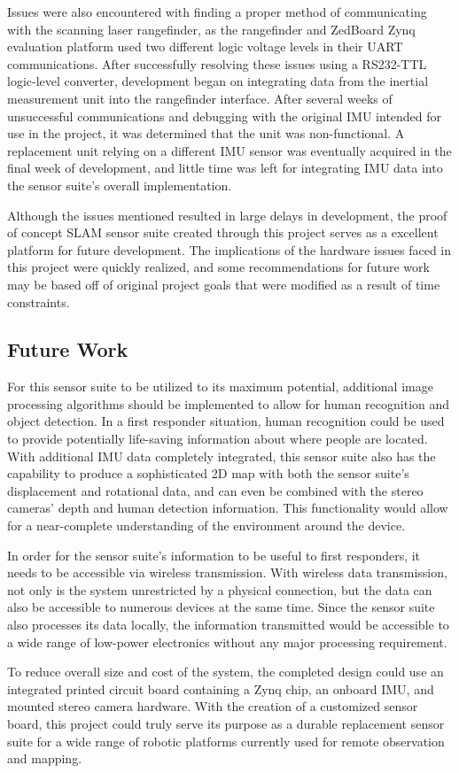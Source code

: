 \par
Issues were also encountered with finding a proper method of communicating with the scanning laser rangefinder, as the rangefinder and ZedBoard Zynq evaluation platform used two different logic voltage levels in their UART communications.  After successfully resolving these issues using a RS232-TTL logic-level converter, development began on integrating data from the inertial measurement unit into the rangefinder interface. After several weeks of unsuccessful communications and debugging with the original IMU intended for use in the project, it was determined that the unit was non-functional. A replacement unit relying on a different IMU sensor was eventually acquired in the final week of development, and little time was left for integrating IMU data into the sensor suite's overall implementation.
\par
Although the issues mentioned resulted in large delays in development, the proof of concept SLAM sensor suite created through this project serves as a excellent platform for future development. The implications of the hardware issues faced in this project were quickly realized, and some recommendations for future work may be based off of original project goals that were modified as a result of time constraints.

\subsection{Future Work}
For this sensor suite to be utilized to its maximum potential, additional image processing algorithms should be implemented to allow for human recognition and object detection. In a first responder situation, human recognition could be used to provide potentially life-saving information about where people are located. With additional IMU data completely integrated, this sensor suite also has the capability to produce a sophisticated 2D map with both the sensor suite's displacement and rotational data, and can even be combined with the stereo cameras' depth and human detection information. This functionality would allow for a near-complete understanding of the environment around the device.
\par
In order for the sensor suite's information to be useful to first responders, it needs to be accessible via wireless transmission. With wireless data transmission, not only is the system unrestricted by a physical connection, but the data can also be accessible to numerous devices at the same time. Since the sensor suite also processes its data locally, the information transmitted would be accessible to a wide range of low-power electronics without any major processing requirement.
\par
To reduce overall size and cost of the system, the completed design could use an integrated printed circuit board containing a Zynq chip, an onboard IMU, and mounted stereo camera hardware. With the creation of a customized sensor board, this project could truly serve its purpose as a durable replacement sensor suite for a wide range of robotic platforms currently used for remote observation and mapping. 




